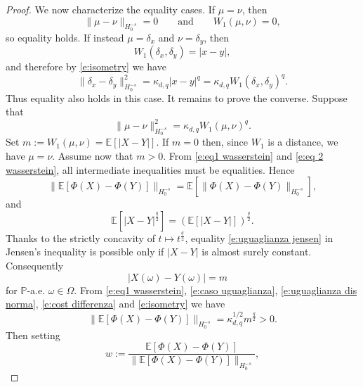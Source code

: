 \documentclass[12pt,a4paper,oneside]{amsart}
\theoremstyle{plain}
\theoremstyle{definition}
\numberwithin{equation}{section}
\numberwithin{figure}{section}
\numberwithin{table}{section}
\theoremstyle{remark}
\newcommand{\E}{\mathbb{E}}
\begin{document}
\begin{proof}
We now characterize the equality cases. If $\mu=\nu$, then
\begin{equation*}
\|\mu-\nu\|_{H_0^{-s}}=0
\qquad\text{and}\qquad
W_1(\mu,\nu)=0,    
\end{equation*}
so equality holds. If instead $\mu=\delta_x$ and $\nu=\delta_y$, then
\begin{equation*}
  W_1(\delta_x,\delta_y)=|x-y|,  
\end{equation*}
and therefore by \eqref{e:isometry} we have
\begin{equation*}
\|\delta_x-\delta_y\|_{H_0^{-s}}^2
= \kappa_{d,q}|x-y|^q = \kappa_{d,q}W_1(\delta_x,\delta_y)^q.    
\end{equation*}
Thus equality also holds in this case. It remains to prove the converse. Suppose that
\begin{equation}\label{e:caso uguaglianza}
\|\mu-\nu\|_{H_0^{-s}}^2=\kappa_{d,q}W_1(\mu,\nu)^q.    
\end{equation}
Set $m:=W_1(\mu,\nu)=\mathbb E [|X-Y|]$. If $m=0$ then, since $W_1$ is a distance, we have $\mu=\nu$. Assume now that $m>0$. From \eqref{e:eq1 wasserstein} and \eqref{e:eq 2 wasserstein}, all
intermediate inequalities must be equalities. 
Hence
\begin{equation}\label{e:uguaglianza dis norma}
\|\mathbb E [\Phi(X)-\Phi(Y)]\|_{H_0^{-s}}=\mathbb E[\|\Phi(X)-\Phi(Y)\|_{H_0^{-s}}],    
\end{equation}
and
\begin{equation}\label{e:uguaglianza jensen}
\mathbb E[|X-Y|^{\frac{q}{2}}]=(\mathbb E[|X-Y|])^{\frac{q}{2}}.    
\end{equation}
Thanks to the strictly concavity of \(t\mapsto t^{\frac{q}{2}}\), equality \eqref{e:uguaglianza jensen} in Jensen's inequality is
possible only if $|X-Y|$ is almost surely constant. Consequently
\begin{equation}\label{e:cost differenza}
|X(\omega)-Y(\omega)|=m \quad    
\end{equation}
for $\mathbb{P}$-a.e. $\omega\in \Omega$. From \eqref{e:eq1 wasserstein}, \eqref{e:caso uguaglianza}, \eqref{e:uguaglianza dis norma}, \eqref{e:cost differenza} and \eqref{e:isometry} we have 
\begin{equation*}
    \|\E[\Phi(X)-\Phi(Y)]\|_{H^{-s}_0}=\kappa_{d,q}^{1/2}m^{\frac{q}{2}}>0.
\end{equation*}
Then setting 
\begin{equation*}
w:=\frac{\mathbb E [\Phi(X)-\Phi(Y)]}{\|\mathbb E [\Phi(X)-\Phi(Y)]\|_{H_0^{-s}}}, 
\end{equation*}

\end{proof}
\end{document}
